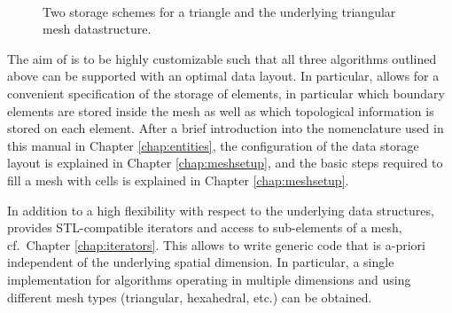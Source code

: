\begin{figure}[bt]
 \centering
\mbox{
 \hspace{0.5cm}
 }
 \caption{Two storage schemes for a triangle and the underlying triangular mesh datastructure.}
 \label{fig:storage-schemes-triangle}
\end{figure}

The aim of {\ViennaGrid} is to be highly customizable such that all three algorithms outlined above can be supported with an optimal data layout.
In particular, {\ViennaGrid} allows for a convenient specification of the storage of elements, in particular which boundary elements are stored inside the mesh as well as which topological information is stored on each element.
After a brief introduction into the nomenclature used in this manual in Chapter \ref{chap:entities}, the configuration of the data storage layout is explained in Chapter \ref{chap:meshsetup}, and the basic steps required to fill a mesh with cells is explained in Chapter \ref{chap:meshsetup}.

In addition to a high flexibility with respect to the underlying data structures, {\ViennaGrid} provides STL-compatible iterators and access to sub-elements of a mesh, cf.~Chapter \ref{chap:iterators}.
This allows to write generic code that is a-priori independent of the underlying spatial dimension.
In particular, a single implementation for algorithms operating in multiple dimensions and using different mesh types (triangular, hexahedral, etc.) can be obtained.

